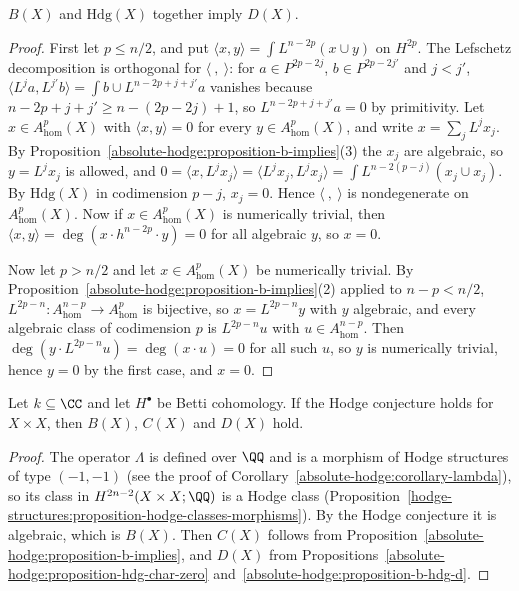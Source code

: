 \begin{proposition}\label{absolute-hodge:proposition-b-hdg-d}
$B(X)$ and $\mathrm{Hdg}(X)$ together imply $D(X)$.
\end{proposition}

\begin{proof}
First let $p \leq n/2$, and put $\langle x, y\rangle = \int L^{n-2p}(x \cup y)$ on $H^{2p}$. The Lefschetz decomposition is orthogonal for $\langle\ ,\ \rangle$: for $a \in P^{2p-2j}$, $b \in P^{2p-2j'}$ and $j < j'$,
$\langle L^ja, L^{j'}b\rangle = \int b \cup L^{n-2p+j+j'}a$ vanishes because $n - 2p + j + j' \geq n - (2p - 2j) + 1$, so $L^{n-2p+j+j'}a = 0$ by primitivity. Let $x \in A^p_{\mathrm{hom}}(X)$ with $\langle x, y\rangle = 0$ for every
$y \in A^p_{\mathrm{hom}}(X)$, and write $x = \sum_jL^jx_j$. By Proposition~\ref{absolute-hodge:proposition-b-implies}(3) the $x_j$ are algebraic, so $y = L^jx_j$ is allowed, and
$0 = \langle x, L^jx_j\rangle = \langle L^jx_j, L^jx_j\rangle = \int L^{n-2(p-j)}(x_j \cup x_j)$. By $\mathrm{Hdg}(X)$ in codimension $p - j$, $x_j = 0$. Hence $\langle\ ,\ \rangle$ is nondegenerate on $A^p_{\mathrm{hom}}(X)$.
Now if $x \in A^p_{\mathrm{hom}}(X)$ is numerically trivial, then $\langle x, y\rangle = \deg(x \cdot h^{n-2p} \cdot y) = 0$ for all algebraic $y$, so $x = 0$.

Now let $p > n/2$ and let $x \in A^p_{\mathrm{hom}}(X)$ be numerically trivial. By Proposition~\ref{absolute-hodge:proposition-b-implies}(2) applied to $n - p < n/2$, $L^{2p-n} \colon A^{n-p}_{\mathrm{hom}} \to A^p_{\mathrm{hom}}$ is
bijective, so $x = L^{2p-n}y$ with $y$ algebraic, and every algebraic class of codimension $p$ is $L^{2p-n}u$ with $u \in A^{n-p}_{\mathrm{hom}}$. Then $\deg(y \cdot L^{2p-n}u) = \deg(x \cdot u) = 0$ for all such $u$, so $y$ is
numerically trivial, hence $y = 0$ by the first case, and $x = 0$.
\end{proof}

\begin{theorem}\label{absolute-hodge:theorem-hodge-implies-standard}
Let $k \subseteq \CC$ and let $H^\bullet$ be Betti cohomology. If the Hodge conjecture holds for $X \times X$, then $B(X)$, $C(X)$ and $D(X)$ hold.
\end{theorem}

\begin{proof}
The operator $\Lambda$ is defined over $\QQ$ and is a morphism of Hodge structures of type $(-1,-1)$ (see the proof of Corollary~\ref{absolute-hodge:corollary-lambda}), so its class in
$H^{2n-2}(X \times X; \QQ)$ is a Hodge class (Proposition~\ref{hodge-structures:proposition-hodge-classes-morphisms}). By the Hodge conjecture it is algebraic, which is $B(X)$. Then $C(X)$ follows from
Proposition~\ref{absolute-hodge:proposition-b-implies}, and $D(X)$ from Propositions~\ref{absolute-hodge:proposition-hdg-char-zero} and~\ref{absolute-hodge:proposition-b-hdg-d}.
\end{proof}

